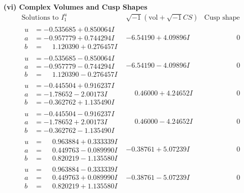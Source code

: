 \documentclass[1p]{elsarticle_modified}
\theoremstyle{definition}
\newcommand{\I}{\sqrt{-1}}
\begin{document}
\newpage\flushleft \textbf{(vi) Complex Volumes and Cusp Shapes}
$$\begin{array}{c|c|c}  
\text{Solutions to }I^u_{1}& \I (\text{vol} + \sqrt{-1}CS) & \text{Cusp shape}\\
 \hline 
\begin{aligned}
u &= -0.535685 + 0.850064 I \\
a &= -0.957779 + 0.744294 I \\
b &= \phantom{-}1.120390 + 0.276457 I\end{aligned}
 & -6.54190 + 4.09896 I & \phantom{-0.000000 } 0 \\ \hline\begin{aligned}
u &= -0.535685 - 0.850064 I \\
a &= -0.957779 - 0.744294 I \\
b &= \phantom{-}1.120390 - 0.276457 I\end{aligned}
 & -6.54190 - 4.09896 I & \phantom{-0.000000 } 0 \\ \hline\begin{aligned}
u &= -0.445504 + 0.916237 I \\
a &= -1.78652 - 2.00173 I \\
b &= -0.362762 + 1.135490 I\end{aligned}
 & \phantom{-}0.46000 + 4.24652 I & \phantom{-0.000000 } 0 \\ \hline\begin{aligned}
u &= -0.445504 - 0.916237 I \\
a &= -1.78652 + 2.00173 I \\
b &= -0.362762 - 1.135490 I\end{aligned}
 & \phantom{-}0.46000 - 4.24652 I & \phantom{-0.000000 } 0 \\ \hline\begin{aligned}
u &= \phantom{-}0.963884 + 0.333339 I \\
a &= \phantom{-}0.449763 - 0.089990 I \\
b &= \phantom{-}0.820219 - 1.135580 I\end{aligned}
 & -0.38761 + 5.07239 I & \phantom{-0.000000 } 0 \\ \hline\begin{aligned}
u &= \phantom{-}0.963884 - 0.333339 I \\
a &= \phantom{-}0.449763 + 0.089990 I \\
b &= \phantom{-}0.820219 + 1.135580 I\end{aligned}
 & -0.38761 - 5.07239 I & \phantom{-0.000000 } 0 \\ \hline\begin{aligned}

\end{aligned}
\end{array}$$
\end{document}
